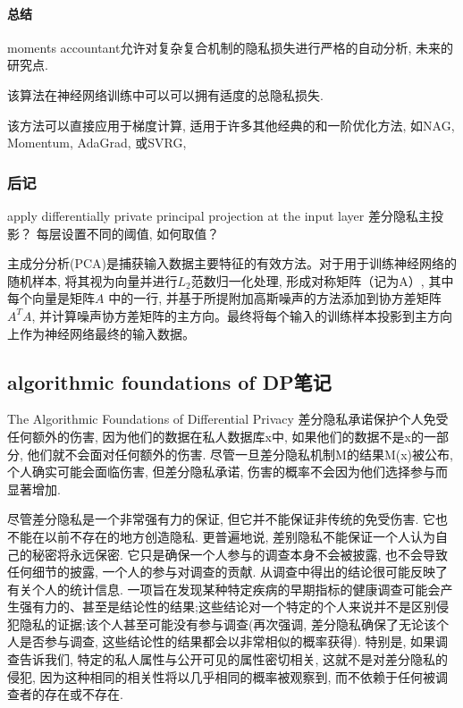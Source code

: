 \paragraph{总结}

moments accountant允许对复杂复合机制的隐私损失进行严格的自动分析, 未来的研究点. 

该算法在神经网络训练中可以可以拥有适度的总隐私损失. 

该方法可以直接应用于梯度计算, 适用于许多其他经典的和一阶优化方法, 如NAG, Momentum, AdaGrad, 或SVRG, 


 

\subsubsection{后记}
 
apply differentially private principal projection at the input layer 差分隐私主投影？
每层设置不同的阈值, 如何取值？

主成分分析(PCA)是捕获输入数据主要特征的有效方法。对于用于训练神经网络的随机样本, 将其视为向量并进行$L_2$范数归一化处理, 形成对称矩阵（记为A）, 其中每个向量是矩阵$A$ 中的一行, 并基于所提附加高斯噪声的方法添加到协方差矩阵$A^T A$, 并计算噪声协方差矩阵的主方向。最终将每个输入的训练样本投影到主方向上作为神经网络最终的输入数据。


\subsection{algorithmic foundations of DP笔记} 


The Algorithmic Foundations of Differential Privacy\cite{Dwork2014Foundations}
差分隐私承诺保护个人免受任何额外的伤害, 因为他们的数据在私人数据库x中, 如果他们的数据不是x的一部分, 他们就不会面对任何额外的伤害. 
尽管一旦差分隐私机制M的结果M(x)被公布, 个人确实可能会面临伤害, 但差分隐私承诺, 伤害的概率不会因为他们选择参与而显著增加. 


尽管差分隐私是一个非常强有力的保证, 但它并不能保证非传统的免受伤害. 它也不能在以前不存在的地方创造隐私. 更普遍地说, 差别隐私不能保证一个人认为自己的秘密将永远保密. 它只是确保一个人参与的调查本身不会被披露, 也不会导致任何细节的披露, 一个人的参与对调查的贡献. 从调查中得出的结论很可能反映了有关个人的统计信息. 一项旨在发现某种特定疾病的早期指标的健康调查可能会产生强有力的、甚至是结论性的结果;这些结论对一个特定的个人来说并不是区别侵犯隐私的证据;该个人甚至可能没有参与调查(再次强调, 差分隐私确保了无论该个人是否参与调查, 这些结论性的结果都会以非常相似的概率获得). 特别是, 如果调查告诉我们, 特定的私人属性与公开可见的属性密切相关, 这就不是对差分隐私的侵犯, 因为这种相同的相关性将以几乎相同的概率被观察到, 而不依赖于任何被调查者的存在或不存在.  

